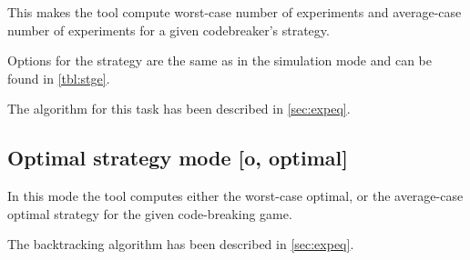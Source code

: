This makes the tool compute worst-case number of experiments and
average-case number of experiments for a given codebreaker's strategy.

Options for the strategy are the same as in the simulation mode and
can be found in \autoref{tbl:stge}.

The algorithm for this task has been described in \autoref{sec:expeq}.

\subsection{Optimal strategy mode [o, optimal]}

In this mode the tool computes either the worst-case optimal,
  or the average-case optimal strategy for the given code-breaking game.

The backtracking algorithm has been described in \autoref{sec:expeq}.


